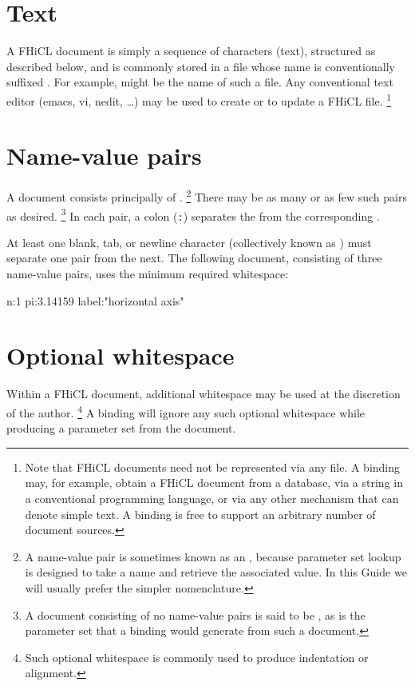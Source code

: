 \documentclass{memarticle}
\newcommand{\fhicl}%
 {FHiCL\xspace}
\begin{document}
\section{Text}

A \fhicl document is simply a sequence of characters
(\ie text),
structured as described below,
and is commonly stored in a file
whose name is conventionally suffixed .
For example,
 might be the name of such a file.
Any conventional text editor
(\eg emacs, vi, nedit, \ldots)
may be used to create or to update a \fhicl file.%
\footnote{%
  Note that \fhicl documents
  need not be represented via any file.
  A binding may, for example,
  obtain a \fhicl document
  from a database,
  via a string in a conventional programming language,
  or
  via any other mechanism that can denote simple text.
  A binding is free
  to support an arbitrary number
  of document sources.%
}

\section{Name-value pairs}

A document consists principally
of .%
\footnote{%
  A name-value pair is sometimes known
  as an ,
  because parameter set lookup
  is designed to take a name
  and retrieve the associated value.
  In this Guide
  we will usually prefer the simpler  nomenclature.%
}
There may be as many or as few such pairs
as desired.%
\footnote{%
  A document consisting of no name-value pairs
  is said to be ,
  as is the parameter set
  that a binding would generate
  from such a document.%
}
In each pair,
a colon (\verb|:|) separates the 
from the corresponding .

At least one blank, tab, or newline character
(collectively known as )
must separate one pair from the next.
The following document,
consisting of three name-value pairs,
uses the minimum required whitespace:
\Needspace{.17in}
\begin{fcllisting}[texcl,escapechar=`]
n:1 pi:3.14159 label:"horizontal axis"
\end{fcllisting}

\section{Optional whitespace}

Within a \fhicl document,
additional whitespace
may be used
at the discretion of the author.%
\footnote{%
  Such optional whitespace
  is commonly used
  to produce indentation or alignment.%
}
A binding will ignore
any such optional whitespace
while producing a parameter set
from the document.
\end{document}
